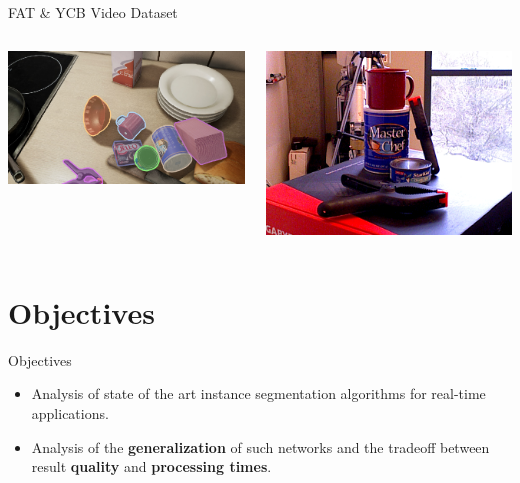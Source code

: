 \documentclass[18pt]{beamer}
\begin{document}
\begin{frame}{FAT \& YCB Video Dataset}
\begin{columns}
\begin{column}{0.5\textwidth}
\includegraphics[width=\textwidth]{figures/fat_example_ann_3.png}
\end{column}
\begin{column}{0.5\textwidth}
\includegraphics[width=\textwidth]{figures/ycb_video.jpg}
\end{column}
\end{columns}

\end{frame}

\section{Objectives}
\begin{frame}{Objectives}
\begin{itemize}
    \item Analysis of state of the art instance segmentation algorithms for real-time applications.
    \item Analysis of the \textbf{generalization} of such networks and the tradeoff between result \textbf{quality} and \textbf{processing times}.
\end{itemize}
\end{frame}
\end{document}
